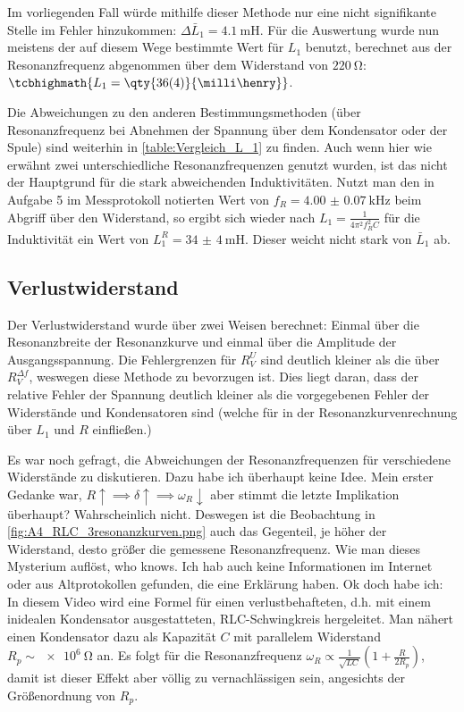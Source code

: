 Im vorliegenden Fall würde mithilfe dieser Methode nur eine nicht signifikante Stelle im Fehler hinzukommen: \(\Delta \bar{L}_1= \qty{4.1}{\milli\henry}\). Für die Auswertung wurde nun meistens der auf diesem Wege bestimmte Wert für \(L_1\) benutzt, berechnet aus der Resonanzfrequenz abgenommen über dem Widerstand von \(\qty{220}{\ohm}\): \(\tcbhighmath{L_1=\qty{36(4)}{\milli\henry}}\).

Die Abweichungen zu den anderen Bestimmungsmethoden (über Resonanzfrequenz bei Abnehmen der Spannung über dem Kondensator oder der Spule) sind weiterhin in \cref{table:Vergleich_L_1} zu finden. Auch wenn hier wie erwähnt zwei unterschiedliche Resonanzfrequenzen genutzt wurden, ist das nicht der Hauptgrund für die stark abweichenden Induktivitäten. Nutzt man den in Aufgabe 5 im Messprotokoll notierten Wert von \(f_R=\qty{4.00(7)}{\kilo\hertz}\) beim Abgriff über den Widerstand, so ergibt sich wieder nach \(L_1=\frac{1}{4\pi^2f_R^2C}\) für die Induktivität ein Wert von \(L_1^R=\qty{34(4)}{\milli\henry}\). Dieser weicht nicht stark von \(\bar{L}_1\) ab.


\subsection{Verlustwiderstand}
Der Verlustwiderstand wurde über zwei Weisen berechnet: Einmal über die Resonanzbreite der Resonanzkurve und einmal über die Amplitude der Ausgangsspannung. Die Fehlergrenzen für \(R_V^U\) sind deutlich kleiner als die über \(R_V^{\Delta f}\), weswegen diese Methode zu bevorzugen ist. Dies liegt daran, dass der relative Fehler der Spannung deutlich kleiner als die vorgegebenen Fehler der Widerstände und Kondensatoren sind (welche für in der Resonanzkurvenrechnung über \(L_1\) und \(R\) einfließen.) 

Es war noch gefragt, die Abweichungen der Resonanzfrequenzen für verschiedene Widerstände zu diskutieren. Dazu habe ich überhaupt keine Idee. Mein erster Gedanke war, \(R\uparrow \implies \delta \uparrow \implies \omega_R \downarrow\) aber stimmt die letzte Implikation überhaupt? Wahrscheinlich nicht. Deswegen ist die Beobachtung in \cref{fig:A4_RLC_3resonanzkurven.png} auch das Gegenteil, je höher der Widerstand, desto größer die gemessene Resonanzfrequenz.
Wie man dieses Mysterium auflöst, who knows. Ich hab auch keine Informationen im Internet oder aus Altprotokollen gefunden, die eine Erklärung haben. Ok doch habe ich: In diesem Video\autocite{rlcloss} wird eine Formel für einen verlustbehafteten, d.h. mit einem inidealen Kondensator ausgestatteten, RLC-Schwingkreis hergeleitet. Man nähert einen Kondensator dazu als Kapazität \(C\) mit parallelem Widerstand \(R_p\sim\qty{e6}{\ohm}\) an. Es folgt für die Resonanzfrequenz \(\omega_R\propto \frac{1}{\sqrt{LC}} (1+\frac{R}{2R_p})\), damit ist dieser Effekt aber völlig zu vernachlässigen sein, angesichts der Größenordnung von \(R_p\).

